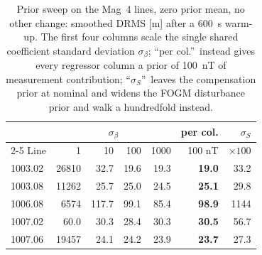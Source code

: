\documentclass{IEEEtaes}
\begin{document}
\begin{table}[t]
\caption{Prior sweep on the Mag~4 lines, zero prior mean, no other change:
smoothed DRMS [m] after a \SI{600}{\second} warm-up. The first four columns scale
the single shared coefficient standard deviation $\sigma_{\beta}$; ``per col.''\
instead gives every regressor column a prior of \SI{100}{\nano\tesla} of
measurement contribution; ``$\sigma_S$''\ leaves the compensation prior at
nominal and widens the FOGM disturbance prior and walk a hundredfold instead.}
\label{tab:priorsweep}
\centering
\setlength{\tabcolsep}{4pt}
\begin{tabular}{l rrrr rr}
\toprule
 & \multicolumn{4}{c}{$\sigma_{\beta}$} & per col. & $\sigma_S$ \\
\cmidrule(lr){2-5}
Line & 1 & 10 & 100 & 1000 & 100 nT & $\times100$ \\
\midrule
1003.02 & 26810 & 32.7 & 19.6 & 19.3 & \textbf{19.0} & 33.2 \\
1003.08 & 11262 & 25.7 & 25.0 & 24.5 & \textbf{25.1} & 29.8 \\
1006.08 & 6574 & 117.7 & 99.1 & 85.4 & \textbf{98.9} & 1144 \\
1007.02 & 60.0 & 30.3 & 28.4 & 30.3 & \textbf{30.5} & 56.7 \\
1007.06 & 19457 & 24.1 & 24.2 & 23.9 & \textbf{23.7} & 27.3 \\
\bottomrule
\end{tabular}
\end{table}
\end{document}
